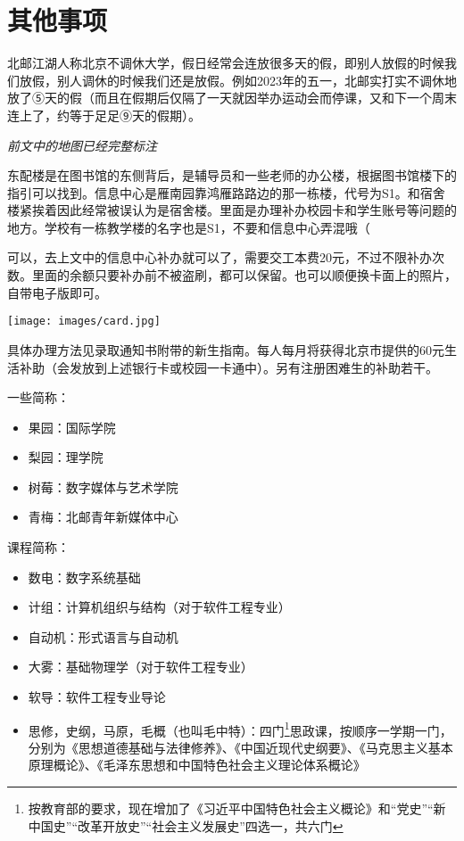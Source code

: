 \section{其他事项}

北邮江湖人称北京不调休大学，假日经常会连放很多天的假，即别人放假的时候我们放假，别人调休的时候我们还是放假。例如2023年的五一，北邮实打实不调休地放了⑤天的假（而且在假期后仅隔了一天就因举办运动会而停课，又和下一个周末连上了，约等于足足⑨天的假期）。


\emph{前文中的地图已经完整标注}

东配楼是在图书馆的东侧背后，是辅导员和一些老师的办公楼，根据图书馆楼下的指引可以找到。信息中心是雁南园靠鸿雁路路边的那一栋楼，代号为S1。和宿舍楼紧挨着因此经常被误认为是宿舍楼。里面是办理补办校园卡和学生账号等问题的地方。学校有一栋教学楼的名字也是S1，不要和信息中心弄混哦（


可以，去上文中的信息中心补办就可以了，需要交工本费20元，不过不限补办次数。里面的余额只要补办前不被盗刷，都可以保留。也可以顺便换卡面上的照片，自带电子版即可。


\begin{center}
    \texttt{[image: images/card.jpg]}
\end{center}

具体办理方法见录取通知书附带的新生指南。每人每月将获得北京市提供的60元生活补助（会发放到上述银行卡或校园一卡通中）。另有注册困难生的补助若干。


一些简称：
\begin{itemize}
    \item 果园：国际学院
    \item 梨园：理学院
    \item 树莓：数字媒体与艺术学院
    \item 青梅：北邮青年新媒体中心
\end{itemize}

课程简称：
\begin{itemize}
    \item 数电：数字系统基础
    \item 计组：计算机组织与结构（对于软件工程专业）
    \item 自动机：形式语言与自动机
    \item 大雾：基础物理学（对于软件工程专业）
    \item 软导：软件工程专业导论
    \item 思修，史纲，马原，毛概（也叫毛中特）：四门\footnote{按教育部的要求，现在增加了《习近平中国特色社会主义概论》和“党史”“新中国史”“改革开放史”“社会主义发展史”四选一，共六门}思政课，按顺序一学期一门，分别为《思想道德基础与法律修养》、《中国近现代史纲要》、《马克思主义基本原理概论》、《毛泽东思想和中国特色社会主义理论体系概论》
\end{itemize}

